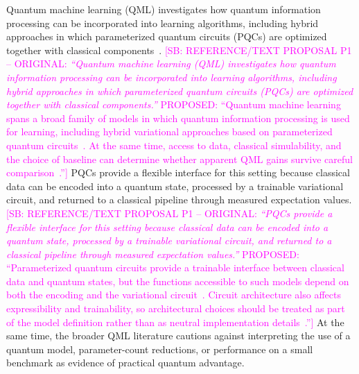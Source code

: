 \documentclass[aps,floatfix,superscriptaddress,twocolumn,tightenlines,amsmath,amssymb,nofootinbib,10pt,longbibliography,prl]{revtex4-2}
\newcommand{\sam}[1]{\textcolor{magenta}{[SB: {#1}]}}
\begin{document}
Quantum machine learning (QML) investigates how quantum information processing can be incorporated into learning algorithms, including hybrid approaches in which parameterized quantum circuits (PQCs) are optimized together with classical components~\cite{Biamonte2017Quantummachinelear,Benedetti2019Parameterizedquant,Cerezo2021Variationalquantum}.
\sam{REFERENCE/TEXT PROPOSAL P1 -- ORIGINAL: \textit{``Quantum machine learning (QML) investigates how quantum information processing can be incorporated into learning algorithms, including hybrid approaches in which parameterized quantum circuits (PQCs) are optimized together with classical components.''} PROPOSED: ``Quantum machine learning spans a broad family of models in which quantum information processing is used for learning, including hybrid variational approaches based on parameterized quantum circuits~\cite{Biamonte2017Quantummachinelear,Benedetti2019Parameterizedquant,Cerezo2021Variationalquantum}. At the same time, access to data, classical simulability, and the choice of baseline can determine whether apparent QML gains survive careful comparison~\cite{Huang2021Powerofdatainquant}.''} PQCs provide a flexible interface for this setting because classical data can be encoded into a quantum state, processed by a trainable variational circuit, and returned to a classical pipeline through measured expectation values.
\sam{REFERENCE/TEXT PROPOSAL P1 -- ORIGINAL: \textit{``PQCs provide a flexible interface for this setting because classical data can be encoded into a quantum state, processed by a trainable variational circuit, and returned to a classical pipeline through measured expectation values.''} PROPOSED: ``Parameterized quantum circuits provide a trainable interface between classical data and quantum states, but the functions accessible to such models depend on both the encoding and the variational circuit~\cite{Benedetti2019Parameterizedquant,Schuld2021Effectofdataencodi}. Circuit architecture also affects expressibility and trainability, so architectural choices should be treated as part of the model definition rather than as neutral implementation details~\cite{Sim2019ExpressibilityandE,Holmes2022ConnectingAnsatzEx}.''} At the same time, the broader QML literature cautions against interpreting the use of a quantum model, parameter-count reductions, or performance on a small benchmark as evidence of practical quantum advantage.
\end{document}
